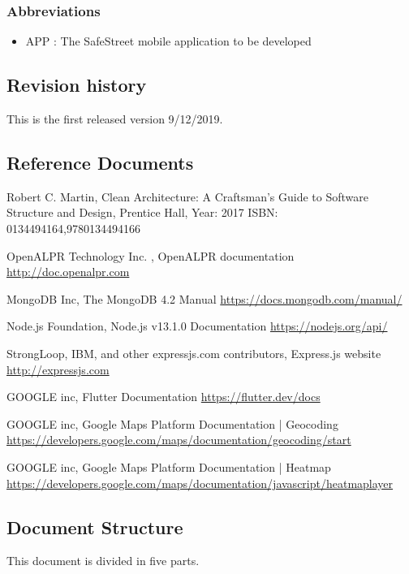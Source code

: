 \subsubsection{Abbreviations}
\begin{itemize}
  \item APP : The SafeStreet mobile application to be developed
\end{itemize}

\subsection{Revision history}
This is the first released version 9/12/2019.

\subsection{Reference Documents}
\begin{thebibliography}{00}


 Robert C. Martin,
Clean Architecture: A Craftsman’s Guide to Software Structure and Design,
Prentice Hall, Year: 2017
ISBN: 0134494164,9780134494166

OpenALPR Technology Inc. ,
OpenALPR documentation \url{http://doc.openalpr.com}

 MongoDB Inc,
The MongoDB 4.2 Manual
\url{https://docs.mongodb.com/manual/}

 Node.js Foundation,
Node.js v13.1.0 Documentation
\url{https://nodejs.org/api/}

 StrongLoop, IBM, and other expressjs.com contributors,
Express.js website
\url{http://expressjs.com}

 GOOGLE inc,
Flutter Documentation
\url{https://flutter.dev/docs}

 GOOGLE inc,
 Google Maps Platform Documentation | Geocoding
 \url{https://developers.google.com/maps/documentation/geocoding/start}

 GOOGLE inc,
 Google Maps Platform Documentation | Heatmap
 \url{https://developers.google.com/maps/documentation/javascript/heatmaplayer}

\end{thebibliography}

\subsection{Document Structure}
This document is divided in five parts.

